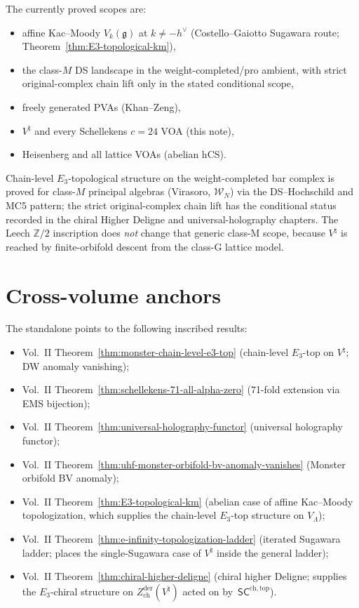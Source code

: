 \documentclass[11pt]{amsart}
\theoremstyle{definition}
\theoremstyle{remark}
\providecommand{\Zder}{Z^{\mathrm{der}}_{\mathrm{ch}}}
\providecommand{\Z}{\mathbb{Z}}
\providecommand{\fg}{\mathfrak{g}}
\providecommand{\SCchtop}{\mathsf{SC}^{\mathrm{ch,top}}}
\begin{document}
The currently proved scopes are:
\begin{itemize}[nosep]
\item affine Kac--Moody $V_k(\fg)$ at $k \neq -h^\vee$
(Costello--Gaiotto Sugawara route;
Theorem~\ref*{thm:E3-topological-km}),
\item the class-$M$ DS landscape in the weight-completed/pro ambient,
with strict original-complex chain lift only in the stated conditional
scope,
\item freely generated PVAs (Khan--Zeng),
\item $V^\natural$ and every Schellekens $c = 24$ VOA (this note),
\item Heisenberg and all lattice VOAs (abelian hCS).
\end{itemize}
Chain-level $E_3$-topological structure on the weight-completed
bar complex is proved for class-$M$ principal algebras (Virasoro,
$\mathcal{W}_N$) via the DS--Hochschild and MC5 pattern; the strict
original-complex chain lift has the conditional status recorded in
the chiral Higher Deligne and universal-holography chapters. The
Leech $\Z/2$ inscription does \emph{not} change that generic class-M
scope, because $V^\natural$ is reached by finite-orbifold descent from
the class-G lattice model.

\section{Cross-volume anchors}

The standalone points to the following inscribed results:
\begin{itemize}[nosep]
\item Vol.~II Theorem~\ref*{thm:monster-chain-level-e3-top}
(chain-level $E_3$-top on $V^\natural$; DW anomaly vanishing);
\item Vol.~II Theorem~\ref*{thm:schellekens-71-all-alpha-zero}
(71-fold extension via EMS bijection);
\item Vol.~II Theorem~\ref*{thm:universal-holography-functor}
(universal holography functor);
\item Vol.~II Theorem~\ref*{thm:uhf-monster-orbifold-bv-anomaly-vanishes}
(Monster orbifold BV anomaly);
\item Vol.~II Theorem~\ref*{thm:E3-topological-km} (abelian case of
affine Kac--Moody topologization, which supplies the chain-level
$E_3$-top structure on $V_\Lambda$);
\item Vol.~II Theorem~\ref*{thm:e-infinity-topologization-ladder}
(iterated Sugawara ladder; places the single-Sugawara case of
$V^\natural$ inside the general ladder);
\item Vol.~II Theorem~\ref*{thm:chiral-higher-deligne} (chiral
higher Deligne; supplies the $E_3$-chiral structure on
$\Zder(V^\natural)$ acted on by~$\SCchtop$).
\end{itemize}
\end{document}
